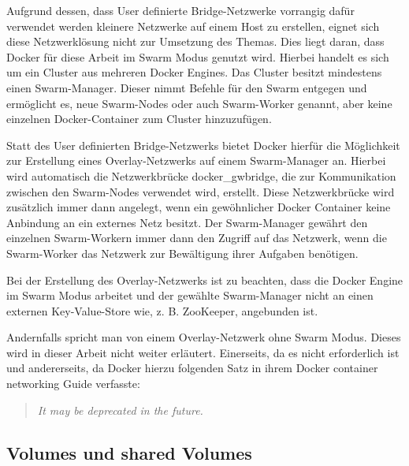 Aufgrund dessen, dass User definierte Bridge-Netzwerke vorrangig dafür verwendet werden kleinere Netzwerke auf einem Host zu erstellen, eignet sich diese Netzwerklösung nicht zur Umsetzung des Themas.
Dies liegt daran, dass Docker für diese Arbeit im Swarm Modus genutzt wird.
Hierbei handelt es sich um ein Cluster aus mehreren Docker Engines.
Das Cluster besitzt mindestens einen Swarm-Manager.
Dieser nimmt Befehle für den Swarm entgegen und ermöglicht es, neue Swarm-Nodes oder auch Swarm-Worker genannt, aber keine einzelnen Docker-Container zum Cluster hinzuzufügen.

Statt des User definierten Bridge-Netzwerks bietet Docker hierfür die Möglichkeit zur Erstellung eines Overlay-Netzwerks auf einem Swarm-Manager an.
Hierbei wird automatisch die Netzwerkbrücke docker\_gwbridge, die zur Kommunikation zwischen den Swarm-Nodes verwendet wird, erstellt.
Diese Netzwerkbrücke wird zusätzlich immer dann angelegt, wenn ein gewöhnlicher Docker Container keine Anbindung an ein externes Netz besitzt.
Der Swarm-Manager gewährt den einzelnen Swarm-Workern immer dann den Zugriff auf das Netzwerk, wenn die Swarm-Worker das Netzwerk zur Bewältigung ihrer Aufgaben benötigen. 

Bei der Erstellung des Overlay-Netzwerks ist zu beachten, dass die Docker Engine im Swarm Modus arbeitet und der gewählte Swarm-Manager nicht an einen externen Key-Value-Store wie, z. B. ZooKeeper, angebunden ist.

Andernfalls spricht man von einem Overlay-Netzwerk ohne Swarm Modus.
Dieses wird in dieser Arbeit nicht weiter erläutert.
Einerseits, da es nicht erforderlich ist und andererseits, da Docker hierzu folgenden Satz in ihrem Docker container networking Guide verfasste:

\begin{quote}
	\textit{\glqq{}It may be deprecated in the future.\grqq{}}
\end{quote}

\subsection{Volumes und shared Volumes}

